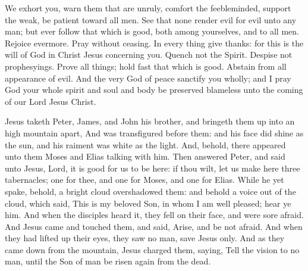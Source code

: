  We exhort you, warn them that are unruly, comfort the feebleminded, support the weak, be patient toward all men. See that none render evil for evil unto any man; but ever follow that which is good, both among yourselves, and to all men. Rejoice evermore. Pray without ceasing. In every thing give thanks: for this is the will of God in Christ Jesus concerning you. Quench not the Spirit. Despise not prophesyings. Prove all things; hold fast that which is good. Abstain from all appearance of evil. And the very God of peace sanctify you wholly; and I pray God your whole spirit and soul and body be preserved blameless unto the coming of our Lord Jesus Christ.


\vspace{-0.4\baselineskip}


\vspace{-0.1\baselineskip}

 Jesus taketh Peter, James, and John his brother, and bringeth them up into an high mountain apart, And was transfigured before them: and his face did shine as the sun, and his raiment was white as the light. And, behold, there appeared unto them Moses and Elias talking with him. Then answered Peter, and said unto Jesus, Lord, it is good for us to be here: if thou wilt, let us make here three tabernacles; one for thee, and one for Moses, and one for Elias. While he yet spake, behold, a bright cloud overshadowed them: and behold a voice out of the cloud, which said, This is my beloved Son, in whom I am well pleased; hear ye him. And when the disciples heard it, they fell on their face, and were sore afraid. And Jesus came and touched them, and said, Arise, and be not afraid. And when they had lifted up their eyes, they saw no man, save Jesus only. And as they came down from the mountain, Jesus charged them, saying, Tell the vision to no man, until the Son of man be risen again from the dead.


\vspace{-0.4\baselineskip}

